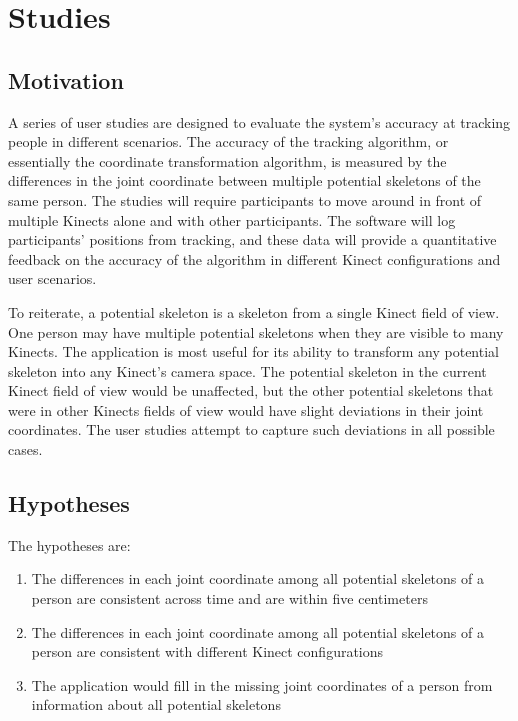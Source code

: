 


\chapter{Studies}

\label{chapter:studies}

\section{Motivation}
\label{sec:studies_motivation}

A series of user studies are designed to evaluate the system's accuracy at tracking people in different scenarios. The accuracy of the tracking algorithm, or essentially the coordinate transformation algorithm, is measured by the differences in the joint coordinate between multiple potential skeletons of the same person. The studies will require participants to move around in front of multiple Kinects alone and with other participants. The software will log participants' positions from tracking, and these data will provide a quantitative feedback on the accuracy of the algorithm in different Kinect configurations and user scenarios.

To reiterate, a potential skeleton is a skeleton from a single Kinect field of view. One person may have multiple potential skeletons when they are visible to many Kinects. The application is most useful for its ability to transform any potential skeleton into any Kinect's camera space. The potential skeleton in the current Kinect field of view would be unaffected, but the other potential skeletons that were in other Kinects fields of view would have slight deviations in their joint coordinates. The user studies attempt to capture such deviations in all possible cases.

\section{Hypotheses}
\label{sec:studies_hypotheses}

The hypotheses are:

\begin{enumerate}
  \item The differences in each joint coordinate among all potential skeletons of a person are consistent across time and are within five centimeters
  \item The differences in each joint coordinate among all potential skeletons of a person are consistent with different Kinect configurations
  \item The application would fill in the missing joint coordinates of a person from information about all potential skeletons
\end{enumerate}


